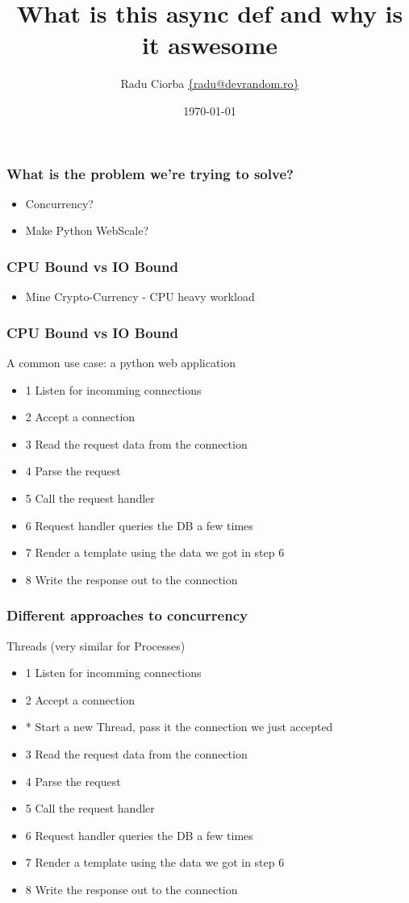\documentclass{beamer}
\title[Async Python]{What is this async def and why is it aswesome} %
\author{Radu Ciorba \href{mailto:radu@devrandom.ro}{\{radu@devrandom.ro\}}} %
\date{\today} %
\begin{document}
\begin{frame}
  \titlepage %
\end{frame}

\begin{frame}
  \frametitle{What is the problem we're trying to solve?}
  \begin{itemize}
  \item Concurrency?
  \item Make Python WebScale?
  \end{itemize}
\end{frame}

\begin{frame}
  \frametitle{CPU Bound vs IO Bound}
  \begin{itemize}
  \item Mine Crypto-Currency - CPU heavy workload
  \end{itemize}
\end{frame}

\begin{frame}
  \frametitle{CPU Bound vs IO Bound}
  A common use case: a python web application
  \begin{itemize}
  \item 1 Listen for incomming connections
  \item 2 Accept a connection
  \item 3 Read the request data from the connection
  \item \colorbox{yellow!30}{4 Parse the request}
  \item \colorbox{yellow!30}{5 Call the request handler}
  \item 6 Request handler queries the DB a few times
  \item \colorbox{yellow!30}{7 Render a template using the data we got in step 6}
  \item 8 Write the response out to the connection
  \end{itemize}
\end{frame}

\begin{frame}
  \frametitle{Different approaches to concurrency}
  Threads (very similar for Processes)
  \begin{itemize}
  \item \colorbox{yellow!30}{1 Listen for incomming connections}
  \item \colorbox{yellow!30}{2 Accept a connection}
  \item \colorbox{yellow!30}{ * Start a new Thread, pass it the connection we just accepted}
  \item 3 Read the request data from the connection
  \item 4 Parse the request
  \item 5 Call the request handler
  \item 6 Request handler queries the DB a few times
  \item 7 Render a template using the data we got in step 6
  \item 8 Write the response out to the connection
  \end{itemize}
\end{frame}
\end{document}
